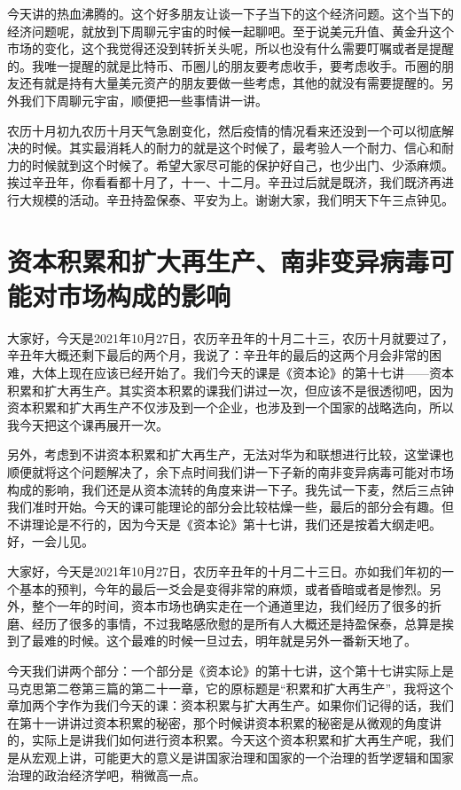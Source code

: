 \documentclass[UTF8, 12pt, a4paper]{ctexrep}
\begin{document}
今天讲的热血沸腾的。这个好多朋友让谈一下子当下的这个经济问题。这个当下的经济问题呢，就放到下周聊元宇宙的时候一起聊吧。至于说美元升值、黄金升这个市场的变化，这个我觉得还没到转折关头呢，所以也没有什么需要叮嘱或者是提醒的。我唯一提醒的就是比特币、币圈儿的朋友要考虑收手，要考虑收手。币圈的朋友还有就是持有大量美元资产的朋友要做一些考虑，其他的就没有需要提醒的。另外我们下周聊元宇宙，顺便把一些事情讲一讲。

农历十月初九农历十月天气急剧变化，然后疫情的情况看来还没到一个可以彻底解决的时候。其实最消耗人的耐力的就是这个时候了，最考验人一个耐力、信心和耐力的时候就到这个时候了。希望大家尽可能的保护好自己，也少出门、少添麻烦。挨过辛丑年，你看看都十月了，十一、十二月。辛丑过后就是既济，我们既济再进行大规模的活动。辛丑持盈保泰、平安为上。谢谢大家，我们明天下午三点钟见。

\section{资本积累和扩大再生产、南非变异病毒可能对市场构成的影响}

大家好，今天是2021年10月27日，农历辛丑年的十月二十三，农历十月就要过了，辛丑年大概还剩下最后的两个月，我说了：辛丑年的最后的这两个月会非常的困难，大体上现在应该已经开始了。我们今天的课是《资本论》的第十七讲——资本积累和扩大再生产。其实资本积累的课我们讲过一次，但应该不是很透彻吧，因为资本积累和扩大再生产不仅涉及到一个企业，也涉及到一个国家的战略选向，所以我今天把这个课再展开一次。

另外，考虑到不讲资本积累和扩大再生产，无法对华为和联想进行比较，这堂课也顺便就将这个问题解决了，余下点时间我们讲一下子新的南非变异病毒可能对市场构成的影响，我们还是从资本流转的角度来讲一下子。我先试一下麦，然后三点钟我们准时开始。今天的课可能理论的部分会比较枯燥一些，最后的部分会有趣。但不讲理论是不行的，因为今天是《资本论》第十七讲，我们还是按着大纲走吧。好，一会儿见。

大家好，今天是2021年10月27日，农历辛丑年的十月二十三日。亦如我们年初的一个基本的预判，今年的最后一爻会是变得非常的麻烦，或者昏暗或者是惨烈。另外，整个一年的时间，资本市场也确实走在一个通道里边，我们经历了很多的折磨、经历了很多的事情，不过我略感欣慰的是所有人大概还是持盈保泰，总算是挨到了最难的时候。这个最难的时候一旦过去，明年就是另外一番新天地了。

今天我们讲两个部分：一个部分是《资本论》的第十七讲，这个第十七讲实际上是马克思第二卷第三篇的第二十一章，它的原标题是“积累和扩大再生产”，我将这个章加两个字作为我们今天的课：资本积累与扩大再生产。如果你们记得的话，我们在第十一讲讲过资本积累的秘密，那个时候讲资本积累的秘密是从微观的角度讲的，实际上是讲我们如何进行资本积累。今天这个资本积累和扩大再生产呢，我们是从宏观上讲，可能更大的意义是讲国家治理和国家的一个治理的哲学逻辑和国家治理的政治经济学吧，稍微高一点。
\end{document}
